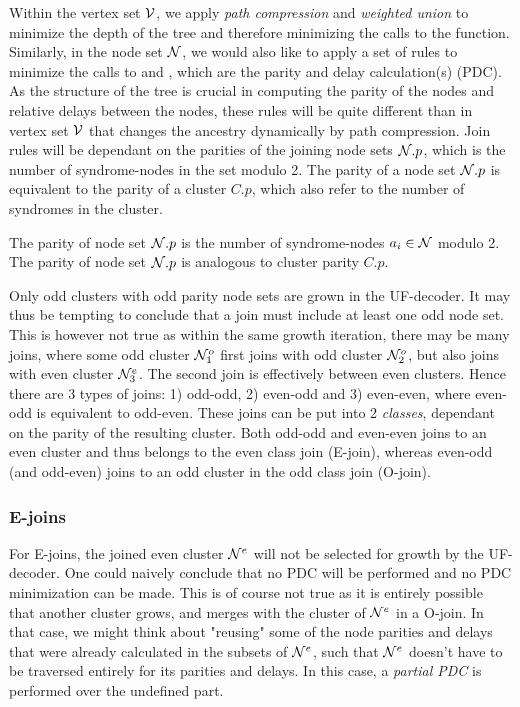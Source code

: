 Within the vertex set $\mathcal{V}$, we apply \emph{path compression} and \emph{weighted union} to minimize the depth of the tree and therefore minimizing the calls to the  function. Similarly, in the node set $\mathcal{N}$, we would also like to apply a set of rules to minimize the calls to  and , which are the parity and delay calculation(s) (PDC). As the structure of the tree is crucial in computing the parity of the nodes and relative delays between the nodes, these rules will be quite different than in vertex set $\mathcal{V}$ that changes the ancestry dynamically by path compression. Join rules will be dependant on the parities of the joining node sets $\mathcal{N}.p$, which is the number of syndrome-nodes in the set modulo 2. The parity of a node set $\mathcal{N}.p$ is equivalent to the parity of a cluster $C.p$, which also refer to the number of syndromes in the cluster.
\begin{lemma}
  The parity of node set $\mathcal{N}.p$ is the number of syndrome-nodes $a_i \in \mathcal{N}$ modulo 2. The parity of node set $\mathcal{N}.p$ is analogous to cluster parity $C.p$.
\end{lemma}

Only odd clusters with odd parity node sets are grown in the UF-decoder. It may thus be tempting to conclude that a join must include at least one odd node set. This is however not true as within the same growth iteration, there may be many joins, where some odd cluster $\mathcal{N}_1^o$ first joins with odd cluster $\mathcal{N}_2^o$, but also joins with even cluster $\mathcal{N}_3^e$. The second join is effectively between even clusters. Hence there are 3 types of joins: 1) odd-odd, 2) even-odd and 3) even-even, where even-odd is equivalent to odd-even. These joins can be put into 2 \emph{classes}, dependant on the parity of the resulting cluster. Both odd-odd and even-even joins to an even cluster and thus belongs to the even class join (E-join), whereas even-odd (and odd-even) joins to an odd cluster in the odd class join (O-join).


\subsubsection{E-joins}

For E-joins, the joined even cluster $\mathcal{N}^e$ will not be selected for growth by the UF-decoder. One could naively conclude that no PDC will be performed and no PDC minimization can be made. This is of course not true as it is entirely possible that another cluster grows, and merges with the cluster of $\mathcal{N}^{e}$ in a O-join. In that case, we might think about "reusing" some of the node parities and delays that were already calculated in the subsets of $\mathcal{N}^e$, such that $\mathcal{N}^{e}$ doesn't have to be traversed entirely for its parities and delays. In this case, a \emph{partial PDC} is performed over the undefined part.

